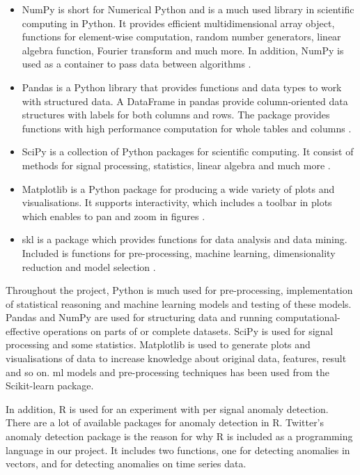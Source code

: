 \documentclass[english, a4paper]{report}
\begin{document}
{{{            \begin{itemize}
                \item NumPy is short for Numerical Python and is a much used library in scientific computing in Python. It provides efficient multidimensional array object, functions for element-wise computation, random number generators, linear algebra function, Fourier transform and much more. In addition, NumPy is used as a container to pass data between algorithms \cite{pythonDA}. 
                \item Pandas is a Python library that provides functions and data types to work with structured data. A DataFrame in pandas provide column-oriented data structures with labels for both columns and rows. The package provides functions with high performance computation for whole tables and columns \cite{pythonDA}.  
                \item SciPy is a collection of Python packages for scientific computing. It consist of methods for signal processing, statistics, linear algebra and much more \cite{pythonDA}.  
                \item Matplotlib is a Python package for producing a wide variety of plots and visualisations. It supports interactivity, which includes a toolbar in plots which enables to pan and zoom in figures \cite{pythonDA}. 
                \item \Gls{skl} is a package which provides functions for data analysis and data mining. Included is functions for pre-processing, machine learning, dimensionality reduction and model selection \cite{pythonML}.
            \end{itemize}    
            
            \par 
            Throughout the project, Python is much used for pre-processing, implementation of statistical reasoning and machine learning models and testing of these models. Pandas and NumPy are used for structuring data and running computational-effective operations on parts of or complete datasets. SciPy is used for signal processing and some statistics. Matplotlib is used to generate plots and visualisations of data to increase knowledge about original data, features, result and so on. \Gls{ml} models and pre-processing techniques has been used from the Scikit-learn package.
            \par
            In addition, R is used for an experiment with per signal anomaly detection. There are a lot of available packages for anomaly detection in R. Twitter's anomaly detection package is the reason for why R is included as a programming language in our project. It includes two functions, one for detecting anomalies in vectors, and for detecting anomalies on time series data. 
        }
    }
    
}
\end{document}
